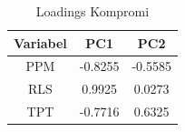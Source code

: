 \begin{table}[H]
\centering
\caption{Loadings Kompromi} \label{tab:loadings}
\begin{tabular}{|c|c|c|}
\hline
\textbf{Variabel} & \textbf{PC1} & \textbf{PC2} \\
\hline
PPM & -0.8255 & -0.5585 \\
RLS & 0.9925 & 0.0273 \\
TPT & -0.7716 & 0.6325 \\
\hline
\end{tabular}
\end{table}